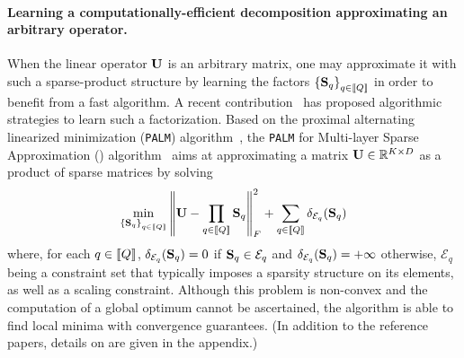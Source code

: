 \paragraph{Learning a computationally-efficient decomposition approximating an arbitrary operator.} When the linear operator ${\mathbf{U}}$ is an arbitrary matrix, one may approximate it with such a sparse-product structure by learning the factors $\left \lbrace{\mathbf{S}}_q\right \rbrace_{q\in\left \llbracket Q\right \rrbracket}$ in order to benefit from a fast algorithm.
A recent contribution~\cite{LeMagoarou2016Flexible} has proposed algorithmic strategies to learn such a factorization. Based on the proximal alternating linearized minimization (\texttt{PALM}) algorithm~\cite{bolte2014proximal}, the \texttt{PALM} for Multi-layer Sparse Approximation (\palm) algorithm~\cite{LeMagoarou2016Flexible} aims at approximating a matrix ${\mathbf{U}}\in{\mathbb{R}}^{K\times D}$ as a product of sparse matrices by solving
\begin{align}
\label{eq:palm4msa}
\min_{\left \lbrace{\mathbf{S}}_q\right \rbrace_{q\in\left \llbracket Q\right \rrbracket}} \left \|{\mathbf{U}} -  \prod_{q\in\left \llbracket Q\right \rrbracket}{{\mathbf{S}}_q}\right \|_F^2 + \sum_{q\in\left \llbracket Q\right \rrbracket} \delta_{\mathcal{E}_q}({\mathbf{S}}_q)
\end{align}
where, for each $q\in\left \llbracket Q\right \rrbracket$, $\delta_{\mathcal{E}_q}({\mathbf{S}}_q)=0$ 
if ${\mathbf{S}}_q \in \mathcal{E}_q$ and $\delta_{\mathcal{E}_q}({\mathbf{S}}_q)=+\infty$ otherwise, $\mathcal{E}_q$ being a constraint set that typically imposes a sparsity structure on its elements, as well as a scaling constraint. 
Although this problem is non-convex and the computation of a global optimum cannot be
ascertained, the \palm algorithm is able to find %
local minima with convergence guarantees. 
(In addition to the reference papers, details on \palm are given in the appendix.)



